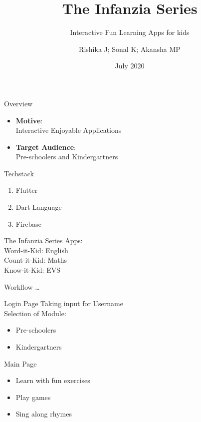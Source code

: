 \documentclass[14pt]{beamer}
\title[SlideSpeak]{The Infanzia Series}
\subtitle{Interactive Fun Learning Apps for kids}
\author[Team 16]{Rishika J; Sonal K; Akansha MP}
\date{July 2020}
\begin{document}
\begin{frame}
    \titlepage
\end{frame}

\begin{frame}{Overview}
    \pause
    \begin{itemize}
    \item \textbf{Motive}: \\
            Interactive Enjoyable Applications
        \pause
    \item \textbf{Target Audience}: \\
            Pre-schoolers and Kindergartners
    \end{itemize}
\end{frame}

\begin{frame}{Techstack}
    \pause
    \begin{enumerate}
        \item Flutter
        \item Dart Language
        \item Firebase  
    \end{enumerate}
\end{frame}

\begin{frame}
    The Infanzia Series Apps: \\ 
    \pause
    \alert{Word-it-Kid: English} \\
    \pause
    \alert{Count-it-Kid: Maths} \\
    \pause
    \alert{Know-it-Kid: EVS} 
\end{frame}

\begin{frame}[standout]
    \alert{Workflow \ldots}
\end{frame}

\begin{frame}{Login Page}
    \pause
    Taking input for Username \\
    \pause
    Selection of Module: \\
    \begin{itemize}
        \item Pre-schoolers
        \item Kindergartners
    \end{itemize}
\end{frame}

\begin{frame}{Main Page}
    \begin{itemize}
            \pause
        \item Learn with fun exercises \\
            \pause
        \item Play games \\
            \pause
        \item Sing along rhymes
    \end{itemize}
\end{frame}
\end{document}
